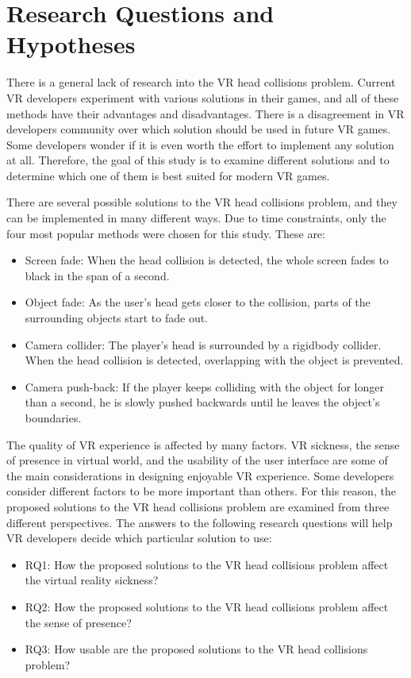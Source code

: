 \section{Research Questions and Hypotheses}

There is a general lack of research into the VR head collisions problem. Current VR developers experiment with various solutions in their games, and all of these methods have their advantages and disadvantages. There is a disagreement in VR developers community over which solution should be used in future VR games. Some developers wonder if it is even worth the effort to implement any solution at all. Therefore, the goal of this study is to examine different solutions and to determine which one of them is best suited for modern VR games.
 
There are several possible solutions to the VR head collisions problem, and they can be implemented in many different ways. Due to time constraints, only the four most popular methods were chosen for this study. These are:

\begin{itemize}
\item Screen fade: When the head collision is detected, the whole screen fades to black in the span of a second.
\item Object fade: As the user's head gets closer to the collision, parts of the surrounding objects start to fade out.
\item Camera collider: The player's head is surrounded by a rigidbody collider. When the head collision is detected, overlapping with the object is prevented.
\item Camera push-back: If the player keeps colliding with the object for longer than a second, he is slowly pushed backwards until he leaves the object's boundaries.
\end{itemize}

The quality of VR experience is affected by many factors. VR sickness, the sense of presence in virtual world, and the usability of the user interface are some of the main considerations in designing enjoyable VR experience. Some developers consider different factors to be more important than others. For this reason, the proposed solutions to the VR head collisions problem are examined from three different perspectives. The answers to the following research questions will help VR developers decide which particular solution to use:

\begin{itemize}
\item RQ1: How the proposed solutions to the VR head collisions problem affect the virtual reality sickness?
\item RQ2: How the proposed solutions to the VR head collisions problem affect the sense of presence?
\item RQ3: How usable are the proposed solutions to the VR head collisions problem?
\end{itemize}


